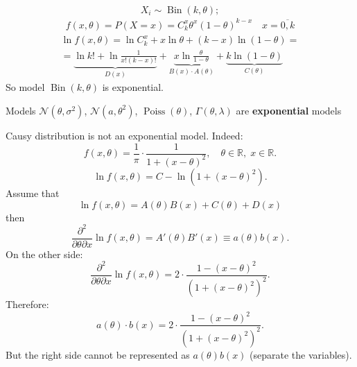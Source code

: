 \begin{example}
    \[
    X_i \sim \operatorname{Bin}(k, \theta);
    \] 
    \begin{gather*}
        f(x, \theta) = P(X = x) = C_k^x \theta^x \left( 1 - \theta \right) ^{k-x}
        \quad x = \overline{0, k}
    \end{gather*}
    \begin{gather*}
        \ln f(x, \theta) = \ln C_k ^x + x \ln \theta + \left( k-x \right) 
        \ln(1- \theta) = \\
        = \underbrace{\ln k! + \ln \frac{1}{x! \left( k-x \right) !}}_{D(x)}
        + \underbrace{x\ln \frac{\theta}{1 - \theta}}_{B(x)\cdot A(\theta)}
        + \underbrace{k \ln(1 - \theta)}_{C(\theta)}
    \end{gather*}
    So model $\operatorname{Bin}(k, \theta)$ is exponential.
\end{example}
\begin{remark}
    Models $\mathcal{N}(\theta, \sigma^2)$, $\mathcal{N}(a, \theta^2)$,
    $\operatorname{Poiss}(\theta)$, $\Gamma(\theta, \lambda)$ are
    \textbf{exponential} models
\end{remark}

\begin{example}
    Causy distribution is not an exponential model.
    Indeed:
    \[
    f(x, \theta) = \frac{1}{\pi} \cdot \frac{1}{1 + \left( x - \theta
    \right) ^2}, \quad \theta\in \mathbb{R}, \; x \in \mathbb{R}
    .\] 
    \[
    \ln f(x, \theta) = C - \ln \left( 1 + \left( x - \theta \right) ^2 \right) 
    .\] 
    Assume that
    \[
    \ln f(x, \theta) = A(\theta) B(x) + C(\theta) + D(x)
    \] 
    then \[
        \frac{\partial ^2}{\partial \theta \partial x} \ln f(x, \theta) =
        A'(\theta) B'(x) \equiv a(\theta) b(x)
    .\] 
    On the other side:
    \[
    \frac{\partial ^2}{\partial \theta \partial x} \ln f(x, \theta) = 
    2 \cdot \frac{1 - (x- \theta)^2}{\left( 1 + (x- \theta)^2 \right) ^2}
    .\] 
    Therefore:
    \[
    a(\theta) \cdot b(x) = 2 \cdot \frac{1 - (x- \theta)^2}{\left(
    1 + (x - \theta)^2 \right) ^2}
    .\] 
    But the right side cannot be represented as $a(\theta) b(x)$
    (separate the variables).
\end{example}


